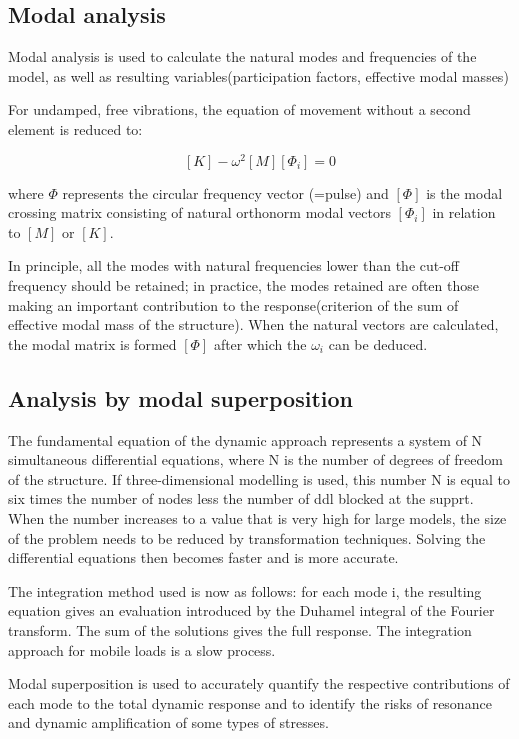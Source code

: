 \subsection{Modal analysis}
Modal analysis is used to calculate the natural modes and frequencies of the model, as well as resulting variables(participation factors, effective modal masses)

For undamped, free vibrations, the equation of movement without a second element is reduced to:

$$  [K] - \omega^2[M][\Phi_i] = 0 $$

where $\Phi$ represents the circular frequency vector (=pulse) and $[\Phi]$ is the modal crossing matrix consisting of natural orthonorm modal vectors $[\Phi_i]$ in relation to $[M]$ or $[K]$.

In principle, all the modes with natural frequencies lower than the cut-off frequency should be retained; in practice, the modes retained are often those making an important contribution to the response(criterion of the sum of effective modal mass of the structure). When the natural vectors are calculated, the modal matrix is formed $[\Phi]$ after which the $\omega_i$ can be deduced.

\subsection{Analysis by modal superposition}
The fundamental equation of the dynamic approach represents a system of N simultaneous differential equations, where N is the number of degrees of freedom of the structure. If three-dimensional modelling is used, this number N is equal to six times the number of nodes less the number of ddl blocked at the supprt. When the number increases to a value that is very high for large models, the size of the problem needs to be reduced by transformation techniques. Solving the differential equations then becomes faster and is more accurate.

The integration method used is now as follows: for each mode i, the resulting equation gives an evaluation introduced by the Duhamel integral of the Fourier transform. The sum of the solutions gives the full response. The integration approach for mobile loads is a slow process.

Modal superposition is used to accurately quantify the respective contributions of each mode to the total dynamic response and to identify the risks of resonance and dynamic amplification of some types of stresses.

